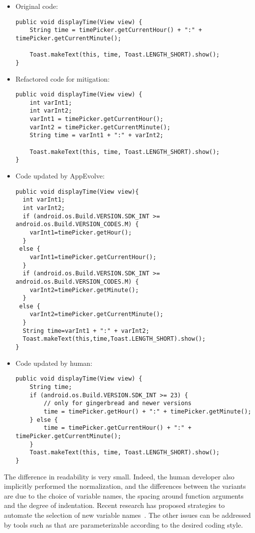 \begin{itemize}

\item Original code:
\begin{lstlisting}[language=text,numbers=none]
public void displayTime(View view) {
    String time = timePicker.getCurrentHour() + ":" + timePicker.getCurrentMinute();

    Toast.makeText(this, time, Toast.LENGTH_SHORT).show();
}
\end{lstlisting}

\item Refactored code for mitigation:
\begin{lstlisting}[language=text,numbers=none]
public void displayTime(View view) {
    int varInt1;
    int varInt2;
    varInt1 = timePicker.getCurrentHour();
    varInt2 = timePicker.getCurrentMinute();
    String time = varInt1 + ":" + varInt2;

    Toast.makeText(this, time, Toast.LENGTH_SHORT).show();
}
\end{lstlisting}


\item Code updated by AppEvolve:
\begin{lstlisting}[language=text,numbers=none]
public void displayTime(View view){
  int varInt1;
  int varInt2;
  if (android.os.Build.VERSION.SDK_INT >= android.os.Build.VERSION_CODES.M) {
    varInt1=timePicker.getHour();
  }
 else {
    varInt1=timePicker.getCurrentHour();
  }
  if (android.os.Build.VERSION.SDK_INT >= android.os.Build.VERSION_CODES.M) {
    varInt2=timePicker.getMinute();
  }
 else {
    varInt2=timePicker.getCurrentMinute();
  }
  String time=varInt1 + ":" + varInt2;
  Toast.makeText(this,time,Toast.LENGTH_SHORT).show();
}
\end{lstlisting}

\item Code updated by human:
\begin{lstlisting}[language=text,numbers=none]
public void displayTime(View view) {
    String time;
    if (android.os.Build.VERSION.SDK_INT >= 23) {
        // only for gingerbread and newer versions
        time = timePicker.getHour() + ":" + timePicker.getMinute();
    } else {
        time = timePicker.getCurrentHour() + ":" + timePicker.getCurrentMinute();
    }
    Toast.makeText(this, time, Toast.LENGTH_SHORT).show();
}
\end{lstlisting}
\end{itemize}

The difference in readability is very small. Indeed, the human developer
also implicitly performed the normalization, and the differences between
the variants are due to the choice of variable names, the spacing around
function arguments and the degree of indentation.  Recent research has
proposed strategies to automate the selection of new variable
names~\cite{...}.  The other issues can be addressed by tools such as
 that are
parameterizable according to the desired coding style.
